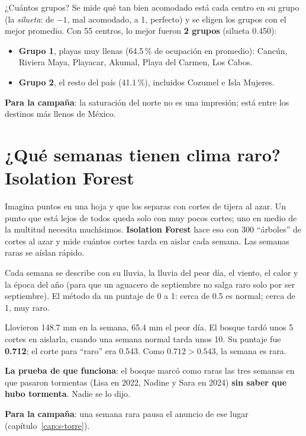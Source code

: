 ¿Cuántos grupos? Se mide qué tan bien acomodado está cada centro en su grupo (la \emph{silueta}: de $-1$, mal acomodado, a
1, perfecto) y se eligen los grupos con el mejor promedio. Con 55 centros, lo mejor fueron \textbf{2 grupos} (silueta
0.450):
\begin{itemize}
\item \textbf{Grupo 1}, playas muy llenas (64.5\,\% de ocupación en promedio): Cancún, Riviera Maya, Playacar, Akumal, Playa
  del Carmen, Los Cabos.
\item \textbf{Grupo 2}, el resto del país (41.1\,\%), incluidos Cozumel e Isla Mujeres.
\end{itemize}
\textbf{Para la campaña}: la saturación del norte no es una impresión; está entre los destinos más llenos de México.

\section{¿Qué semanas tienen clima raro? Isolation Forest}
\begin{intuicion}
Imagina puntos en una hoja y que los separas con cortes de tijera al azar. Un punto que está lejos de todos queda solo
con muy pocos cortes; uno en medio de la multitud necesita muchísimos. \textbf{Isolation Forest} hace eso con 300
``árboles'' de cortes al azar y mide cuántos cortes tarda en aislar cada semana. Las semanas raras se aíslan rápido.
\end{intuicion}

Cada semana se describe con su lluvia, la lluvia del peor día, el viento, el calor y la época del año (para que un
aguacero de septiembre no salga raro solo por ser septiembre). El método da un puntaje de 0 a 1: cerca de 0.5 es normal;
cerca de 1, muy raro.

\begin{ejemplo}
Llovieron 148.7 mm en la semana, 65.4 mm el peor día. El bosque tardó unos 5 cortes en aislarla, cuando una semana normal
tarda unos 10. Su puntaje fue \textbf{0.712}; el corte para ``raro'' era 0.543. Como $0.712>0.543$, la semana es rara.
\end{ejemplo}

\textbf{La prueba de que funciona}: el bosque marcó como raras las tres semanas en que pasaron tormentas (Lisa en 2022,
Nadine y Sara en 2024) \textbf{sin saber que hubo tormenta}. Nadie se lo dijo.

\textbf{Para la campaña}: una semana rara pausa el anuncio de ese lugar (capítulo~\ref{cap:s-torre}).

